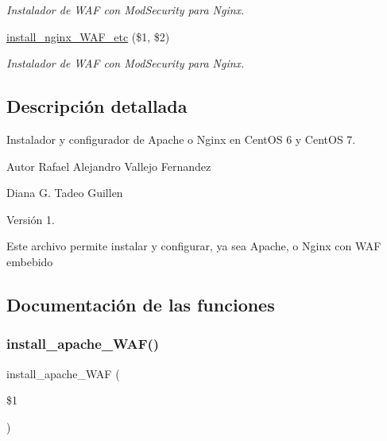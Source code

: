 \begin{DoxyCompactItemize}
\begin{DoxyCompactList}\small\item\em Instalador de W\+AF con Mod\+Security para Nginx. \end{DoxyCompactList}\item 
\hyperlink{Apache__Nginx__CentOS_8sh_a23436949ee6add4c036008836b5dfdb0}{install\+\_\+nginx\+\_\+\+W\+A\+F\+\_\+etc} (\$1, \$2)
\begin{DoxyCompactList}\small\item\em Instalador de W\+AF con Mod\+Security para Nginx. \end{DoxyCompactList}\end{DoxyCompactItemize}


\subsection{Descripción detallada}
Instalador y configurador de Apache o Nginx en Cent\+OS 6 y Cent\+OS 7. 

\begin{DoxyAuthor}{Autor}
Rafael Alejandro Vallejo Fernandez 

Diana G. Tadeo Guillen 
\end{DoxyAuthor}
\begin{DoxyVersion}{Versión}
1.
\end{DoxyVersion}
Este archivo permite instalar y configurar, ya sea Apache, o Nginx con W\+AF embebido 

\subsection{Documentación de las funciones}
\mbox{\label{Apache__Nginx__CentOS_8sh_a7a45cf4f454e9ef11157535c09cbddd9}} 
\subsubsection{\texorpdfstring{install\+\_\+apache\+\_\+\+W\+A\+F()}{install\_apache\_WAF()}}
{\footnotesize\ttfamily install\+\_\+apache\+\_\+\+W\+AF (\begin{DoxyParamCaption}\item[{}]{\$1 }\end{DoxyParamCaption})}



